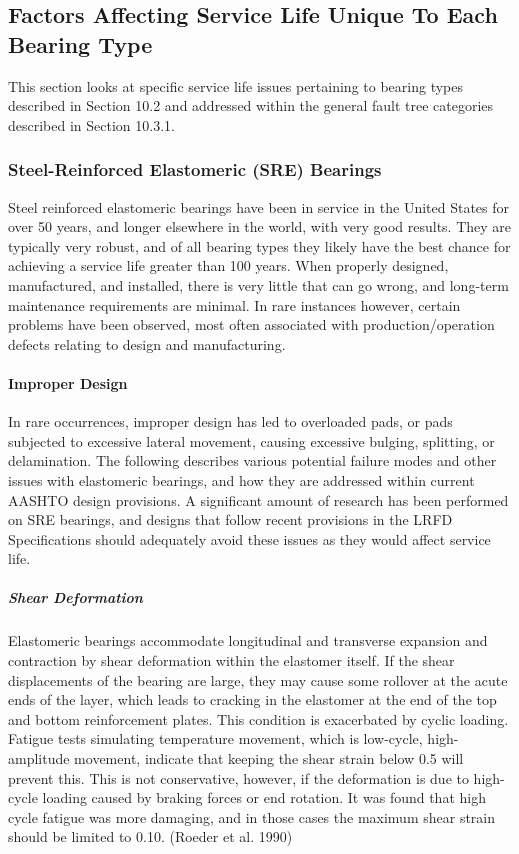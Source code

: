 \subsection{Factors Affecting Service Life Unique To Each Bearing Type}
This section looks at specific service life issues pertaining to bearing types described in Section 10.2 and addressed within the general fault tree categories described in Section 10.3.1.
\subsubsection{Steel-Reinforced Elastomeric (SRE) Bearings}
Steel reinforced elastomeric bearings have been in service in the United States for over 50 years, and longer elsewhere in the world, with very good results. They are typically very robust, and of all bearing types they likely have the best chance for achieving a service life greater than 100 years. When properly designed, manufactured, and installed, there is very little that can go wrong, and long-term maintenance requirements are minimal. In rare instances however, certain problems have been observed, most often associated with production/operation defects relating to design and manufacturing.

\paragraph{Improper Design}
In rare occurrences, improper design has led to overloaded pads, or pads subjected to excessive lateral movement, causing excessive bulging, splitting, or delamination. The following describes various potential failure modes and other issues with elastomeric bearings, and how they are addressed within current AASHTO design provisions. A significant amount of research has been performed on SRE bearings, and designs that follow recent provisions in the LRFD Specifications should adequately avoid these issues as they would affect service life.


\subparagraph{Shear Deformation}
Elastomeric bearings accommodate longitudinal and transverse expansion and contraction by shear deformation
within the elastomer itself. If the shear displacements of the bearing are large, they may cause some rollover at the
acute ends of the layer, which leads to cracking in the elastomer at the end of the top and bottom reinforcement
plates. This condition is exacerbated by cyclic loading. Fatigue tests simulating temperature movement, which is
low-cycle, high-amplitude movement, indicate that keeping the shear strain below 0.5 will prevent this. This is not
conservative, however, if the deformation is due to high-cycle loading caused by braking forces or end rotation. It
was found that high cycle fatigue was more damaging, and in those cases the maximum shear strain should be limited
to 0.10. (Roeder et al. 1990)


